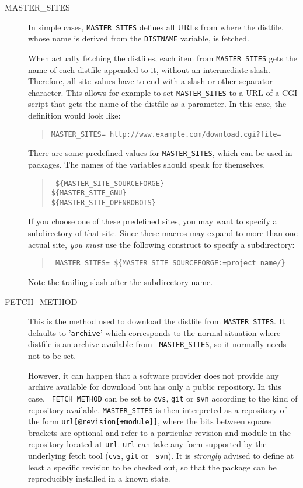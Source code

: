 \begin{description}
   \item[MASTER\_SITES] In simple cases, {\tt MASTER\_SITES}  defines all URLs
   from where the distfile, whose name is derived from the {\tt DISTNAME}
   variable, is fetched.

   When actually fetching the distfiles, each item from {\tt MASTER\_SITES}
   gets the name of each distfile appended to it, without an intermediate
   slash. Therefore, all site values have to end with a slash or other
   separator character. This allows for example to set {\tt MASTER\_SITES} to a
   URL of a CGI script that gets the name of the distfile as a parameter. In
   this case, the definition would look like:
   \begin{quote}
      {\tt MASTER\_SITES=   http://www.example.com/download.cgi?file=}
   \end{quote}

   There are some predefined values for {\tt MASTER\_SITES}, which can be used
   in packages. The names of the variables should speak for themselves.
   \begin{quote}\tt
      \$\{MASTER\_SITE\_SOURCEFORGE\}\\
      \$\{MASTER\_SITE\_GNU\}\\
      \$\{MASTER\_SITE\_OPENROBOTS\}
   \end{quote}

   If you choose one of these predefined sites, you may want to specify a
   subdirectory of that site. Since these macros may expand to more than one
   actual site, {\em you must} use the following construct to specify a
   subdirectory:
   \begin{quote}\tt
      MASTER\_SITES=~\$\{MASTER\_SITE\_SOURCEFORGE:=project\_name/\}
   \end{quote}
   Note the trailing slash after the subdirectory name.

   \smallbreak
   \item[FETCH\_METHOD] This is the method used to download the distfile from
   {\tt MASTER\_SITES}. It defaults to '{\tt archive}' which corresponds to the
   normal situation where distfile is an archive available from {\tt
   MASTER\_SITES}, so it normally needs not to be set.

   However, it can happen that a software provider does not provide any archive
   available for download but has only a public repository. In this case, {\tt
   FETCH\_METHOD} can be set to {\tt cvs}, {\tt git} or {\tt svn} according to
   the kind of repository available. {\tt MASTER\_SITES} is then interpreted as
   a repository of the form {\tt url[@revision[+module]]}, where the bits
   between square brackets are optional and refer to a particular revision and
   module in the repository located at {\tt url}. {\tt url} can take any form
   supported by the underlying fetch tool ({\tt cvs}, {\tt git} or {\tt
   svn}). It is {\em strongly} advised to define at least a specific revision
   to be checked out, so that the package can be reproducibly installed in a
   known state.

\end{description}

